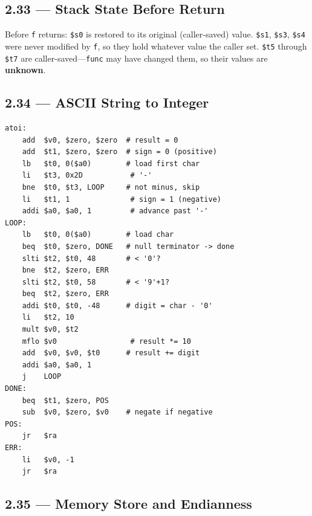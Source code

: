 \subsection*{2.33 --- Stack State Before Return}
\hypertarget{sol-2.33}{}

Before \texttt{f} returns: \texttt{\$s0} is restored to its original
(caller-saved) value. \texttt{\$s1}, \texttt{\$s3}, \texttt{\$s4} were never
modified by \texttt{f}, so they hold whatever value the caller set.
\texttt{\$t5} through \texttt{\$t7} are caller-saved---\texttt{func} may
have changed them, so their values are \textbf{unknown}.

\subsection*{2.34 --- ASCII String to Integer}
\hypertarget{sol-2.34}{}

\begin{verbatim}
atoi:
    add  $v0, $zero, $zero  # result = 0
    add  $t1, $zero, $zero  # sign = 0 (positive)
    lb   $t0, 0($a0)        # load first char
    li   $t3, 0x2D           # '-'
    bne  $t0, $t3, LOOP     # not minus, skip
    li   $t1, 1              # sign = 1 (negative)
    addi $a0, $a0, 1         # advance past '-'
LOOP:
    lb   $t0, 0($a0)        # load char
    beq  $t0, $zero, DONE   # null terminator -> done
    slti $t2, $t0, 48       # < '0'?
    bne  $t2, $zero, ERR
    slti $t2, $t0, 58       # < '9'+1?
    beq  $t2, $zero, ERR
    addi $t0, $t0, -48      # digit = char - '0'
    li   $t2, 10
    mult $v0, $t2
    mflo $v0                 # result *= 10
    add  $v0, $v0, $t0      # result += digit
    addi $a0, $a0, 1
    j    LOOP
DONE:
    beq  $t1, $zero, POS
    sub  $v0, $zero, $v0    # negate if negative
POS:
    jr   $ra
ERR:
    li   $v0, -1
    jr   $ra
\end{verbatim}

\subsection*{2.35 --- Memory Store and Endianness}
\hypertarget{sol-2.35}{}

